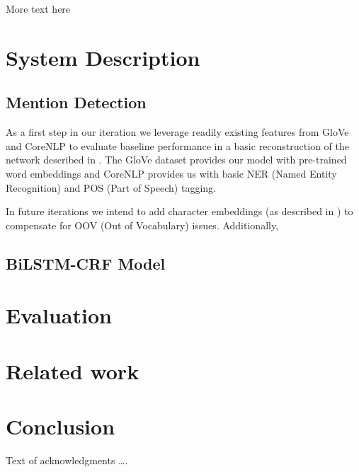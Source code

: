 \documentclass[sigplan,10pt]{acmart}
\begin{document}
More text here


\section{System Description}
\subsection{Mention Detection}
As a first step in our iteration we leverage readily existing features from GloVe and CoreNLP to evaluate baseline performance in a basic reconstruction of the network described in \cite{YangThe2017}. The GloVe dataset provides our model with pre-trained word embeddings and CoreNLP provides us with basic NER (Named Entity Recognition) and POS (Part of Speech) tagging.

In future iterations we intend to add character embeddings (as described in \cite{Lample2016NeuralRecognition}) to compensate for OOV (Out of Vocabulary) issues. Additionally, 

\subsection{BiLSTM-CRF Model}

\lipsum[4-10] %


\section{Evaluation}

\lipsum[11-13] %


\section{Related work}

\lipsum[14-15] %

\section{Conclusion}

\lipsum[16-17] %
    
\begin{acks}
Text of acknowledgments \ldots.
\end{acks}



\end{document}
